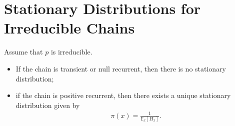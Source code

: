 \section{Stationary Distributions for Irreducible Chains}
\begin{theorem}[]
	Assume that $p$ is irreducible. 
\begin{itemize}
	\item If the chain is transient or null recurrent, then there is no stationary distribution;
	\item if the chain is positive recurrent, then there exists a unique stationary distribution given by 
		\begin{align}
		\boxed{\pi (x) = \frac{1}{\mathbb{E}_{x} \left[ H_x \right] }}
		.\end{align}
		
\end{itemize}
\end{theorem}
